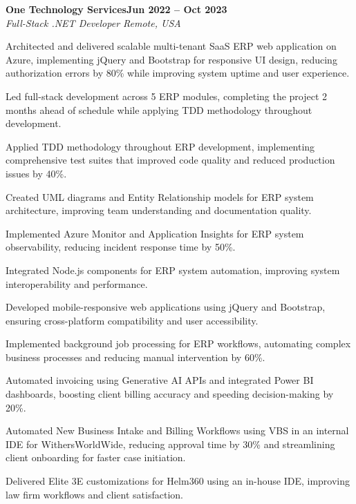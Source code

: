 \documentclass[letterpaper,10pt]{article}
\newcommand{\headingBf}[2]{
  \hspace{10pt}\textbf{#1}\hfill\textbf{#2}\\
}
\newcommand{\headingIt}[2]{
  \hspace{10pt}\textit{#1}\hfill\textit{#2}\\
}
\newenvironment{resume_list}{
  \vspace{-7pt}
  \begin{itemize}[itemsep=-2px, parsep=1pt, leftmargin=30pt]
}{
  \end{itemize}
}
\begin{document}
\headingBf{One Technology Services}{Jun 2022 -- Oct 2023}
\headingIt{Full-Stack .NET Developer \hfill Remote, USA}{}
\begin{resume_list}
    \item Architected and delivered scalable multi-tenant SaaS ERP web application on Azure, implementing jQuery and Bootstrap for responsive UI design, reducing authorization errors by 80\% while improving system uptime and user experience.
    \item Led full-stack development across 5 ERP modules, completing the project 2 months ahead of schedule while applying TDD methodology throughout development.
    \item Applied TDD methodology throughout ERP development, implementing comprehensive test suites that improved code quality and reduced production issues by 40\%.
    \item Created UML diagrams and Entity Relationship models for ERP system architecture, improving team understanding and documentation quality.
    \item Implemented Azure Monitor and Application Insights for ERP system observability, reducing incident response time by 50\%.
    \item Integrated Node.js components for ERP system automation, improving system interoperability and performance.
    \item Developed mobile-responsive web applications using jQuery and Bootstrap, ensuring cross-platform compatibility and user accessibility.
    \item Implemented background job processing for ERP workflows, automating complex business processes and reducing manual intervention by 60\%.
    \item Automated invoicing using Generative AI APIs and integrated Power BI dashboards, boosting client billing accuracy and speeding decision-making by 20\%.
    \item Automated New Business Intake and Billing Workflows using VBS in an internal IDE for WithersWorldWide, reducing approval time by 30\% and streamlining client onboarding for faster case initiation.
    \item Delivered Elite 3E customizations for Helm360 using an in-house IDE, improving law firm workflows and client satisfaction.
\end{resume_list}
\end{document}
